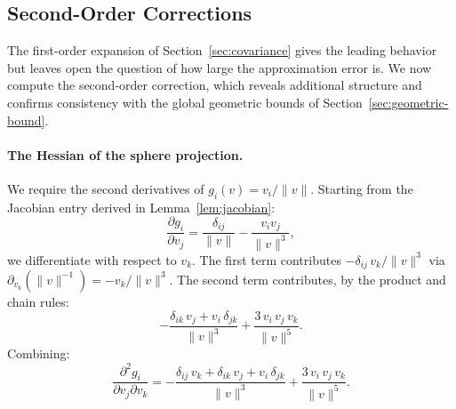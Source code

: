 %
%
%
%
%

\subsection{Second-Order Corrections}
\label{sec:second-order}

The first-order expansion of Section~\ref{sec:covariance} gives the
leading behavior but leaves open the question of how large the
approximation error is.
We now compute the second-order correction, which reveals additional
structure and confirms consistency with the global geometric bounds
of Section~\ref{sec:geometric-bound}.

\paragraph{The Hessian of the sphere projection.}

We require the second derivatives of $g_i(v) = v_i / \|v\|$.
Starting from the Jacobian entry derived in Lemma~\ref{lem:jacobian}:
%
\begin{equation}
  \frac{\partial g_i}{\partial v_j}
  = \frac{\delta_{ij}}{\|v\|} - \frac{v_i v_j}{\|v\|^3},
\end{equation}
%
we differentiate with respect to $v_k$.
The first term contributes $-\delta_{ij}\,v_k / \|v\|^3$ via
$\partial_{v_k}(\|v\|^{-1}) = -v_k / \|v\|^3$.
The second term contributes, by the product and chain rules:
%
\begin{equation}
  -\frac{\delta_{ik}\,v_j + v_i\,\delta_{jk}}{\|v\|^3}
  + \frac{3\,v_i\,v_j\,v_k}{\|v\|^5}.
\end{equation}
%
Combining:
%
\begin{equation}
  \frac{\partial^2 g_i}{\partial v_j \partial v_k}
  = -\frac{\delta_{ij}\,v_k + \delta_{ik}\,v_j + v_i\,\delta_{jk}}{\|v\|^3}
  + \frac{3\,v_i\,v_j\,v_k}{\|v\|^5}.
  \label{eq:hessian-components}
\end{equation}

